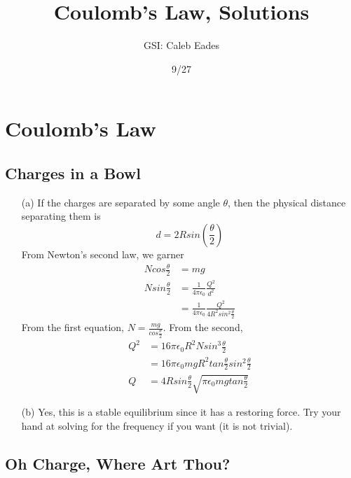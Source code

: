 \documentclass{article}
\begin{document}
\title{Coulomb's Law, Solutions}
\author{GSI: Caleb Eades}
\date{9/27}
\maketitle

\section{Coulomb's Law}

\subsection{Charges in a Bowl}

\begin{itemize}
	\item[(a)] If the charges are separated by some angle $\theta$, then the physical distance separating them is
	\begin{equation}
	d = 2Rsin\left(\frac{\theta}{2}\right)
	\end{equation}
	From Newton's second law, we garner
	\begin{align*}
	Ncos\frac{\theta}{2} &= mg \\
	Nsin\frac{\theta}{2} &= \frac{1}{4\pi\epsilon_0}\frac{Q^2}{d^2} \\
	&= \frac{1}{4\pi\epsilon_0}\frac{Q^2}{4R^2sin^2\frac{\theta}{2}}
	\end{align*}
	From the first equation, $N = \frac{mg}{cos\frac{\theta}{2}}$. From the second,
	\begin{align*}
	Q^2 &= 16\pi\epsilon_0 R^2 N sin^3\frac{\theta}{2} \\
	&= 16\pi\epsilon_0 mgR^2 tan\frac{\theta}{2}sin^2\frac{\theta}{2} \\
	Q &= 4Rsin\frac{\theta}{2}\sqrt{\pi\epsilon_0 mgtan\frac{\theta}{2}}
	\end{align*}
	\item[(b)] Yes, this is a stable equilibrium since it has a restoring force. Try your hand at solving for the frequency if you want (it is not trivial).
\end{itemize}

\newpage

\subsection{Oh Charge, Where Art Thou?}
\end{document}
